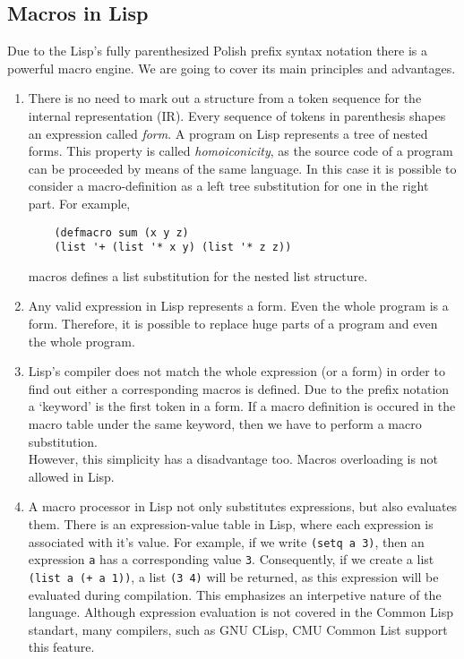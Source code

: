 \subsection{Macros in Lisp}
Due to the Lisp's fully parenthesized Polish prefix syntax notation there is a
powerful macro engine. We are going to cover its main principles and
advantages.
\begin{enumerate}
    \item There is no need to mark out a structure from a token sequence for
    the internal representation (IR). Every sequence of tokens in parenthesis
    shapes an expression called \emph{form}. A program on Lisp represents a tree
    of nested forms. This property is called \emph{homoiconicity}, as the
    source code of a program can be proceeded by means of the same language. In
    this case it is possible to consider a macro-definition as a left tree
    substitution for one in the right part. For example, 
    \begin{verbatim}
    (defmacro sum (x y z) 
    (list '+ (list '* x y) (list '* z z))
    \end{verbatim} 
    macros defines a list substitution for the nested list structure.
    \item Any valid expression in Lisp represents a form. Even the whole
    program is a form.  Therefore, it is possible to replace huge parts of a
    program and even the whole program.  
    \item Lisp's compiler does not match the whole expression (or a form) in
    order to find out either a corresponding macros is defined. Due to the
    prefix notation a `keyword' is the first token in a form.  If a macro
    definition is occured in the macro table under the same keyword, then we
    have to perform a macro substitution.  \\
    However, this simplicity has a disadvantage too. Macros overloading is
    not allowed in Lisp.  
    \item A macro processor in Lisp not only substitutes
    expressions, but also evaluates them. There is an expression-value table in
    Lisp, where each expression is associated with it's value. For example, if
    we write \verb|(setq a 3)|, then an expression \verb|a| has a corresponding
    value \verb|3|. Consequently, if we create a list \verb|(list a (+ a 1))|,
    a list \verb|(3 4)| will be returned, as this expression will be evaluated
    during compilation. This emphasizes an interpetive nature of the language.
    Although expression evaluation is not covered in the Common Lisp standart,
    many compilers, such as GNU CLisp, CMU Common List support this feature.
\end{enumerate}
